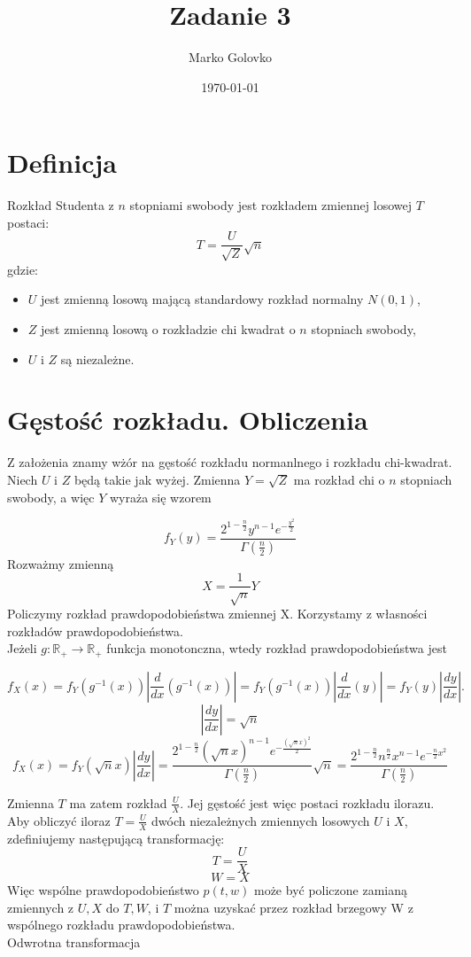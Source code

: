 \documentclass[12pt]{article}
\title{Zadanie 3}
\author{Marko Golovko}
\date{\today}
\begin{document}
\maketitle

\section*{Definicja}
Rozkład Studenta z $n$ stopniami swobody jest rozkładem zmiennej losowej $T$ postaci:
	$$ T = \frac{U}{\sqrt{Z}}\sqrt{n}$$
gdzie:
\begin{itemize}
	\item $U$ jest zmienną losową mającą standardowy rozkład normalny $N(0,1)$,
	\item $Z$  jest zmienną losową o rozkładzie chi kwadrat o $n$ stopniach swobody,
	\item $U$ i $Z$ są niezależne.
\end{itemize}

\section*{Gęstość rozkładu. Obliczenia}
Z założenia znamy wżór na gęstość rozkładu normanlnego i rozkładu chi-kwadrat.  \\
Niech $U$ i $Z$ będą takie jak wyżej. Zmienna $Y = \sqrt{Z}$ ma rozkład chi o $n$ 
stopniach swobody, a więc $Y$ wyraża się wzorem 
	
$$ f_{Y}(y)=\frac{2^{1-\frac{n}{2}}y^{n-1}e^{-\frac{y^{2}}{2}}}{\Gamma(\frac{n}{2})} $$
Rozważmy zmienną 
$$ X = \frac{1}{\sqrt{n}}Y$$
Policzymy rozkład prawdopodobieństwa zmiennej X. Korzystamy z własności rozkładów prawdopodobieństwa. \\
Jeżeli $ g:{\mathbb {R_{+}} }\rightarrow {\mathbb {R_{+}}}$ funkcja monotonczna, wtedy rozkład prawdopodobieństwa jest

 $$ f_{X}(x)=f_{Y}(g^{-1}(x))|{\frac {d}{dx}} (g^{-1}(x))| = f_{Y}(g^{-1}(x))|{\frac {d}{dx}}(y)| = f_{Y}(y)|\frac {dy}{dx}| . $$
 $$ |\frac {dy}{dx}| = \sqrt{n}$$
 $$ f_{X}(x) = f_{Y}(\sqrt{n}x)|\frac {dy}{dx}| = 
 \frac{2^{1-\frac{n}{2}}(\sqrt{n}x)^{n-1}e^{-\frac{(\sqrt{n}x)^{2}}{2}}}{\Gamma(\frac{n}{2})}\sqrt{n} = 
 \frac{2^{1-\frac{n}{2}}n^{\frac{n}{2}}x^{n-1}e^{-\frac{n}{2}x^{2}}}{\Gamma(\frac{n}{2})}$$
	
Zmienna $T$ ma zatem rozkład $\frac{U}{X}$. Jej gęstość jest więc postaci rozkładu ilorazu. \\
Aby obliczyć iloraz $T = \frac{U}{X}$ dwóch niezależnych zmiennych losowych $U$ i $X$, 
zdefiniujemy następującą transformację:
$$T = \frac{U}{X}$$
$$W = X$$
Więc wspólne prawdopodobieństwo $p(t,w)$ może być policzone zamianą zmiennych z $U,X$ do $T,W$, 
i $T$ można uzyskać przez rozkład brzegowy W z wspólnego rozkładu prawdopodobieństwa. \\
Odwrotna transformacja
\end{document}
